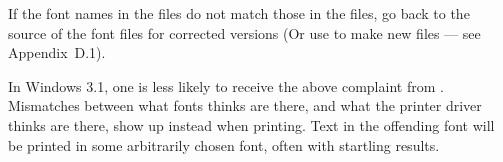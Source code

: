  If the font names in the {\PFM} files do not match
those in the {\PFB} files, go back to the source of the font files
for corrected versions (Or use {\AFMTOPFM} to make new {\PFM} files
--- see Appendix~D.1).

\noindent
In Windows 3.1, one is less likely to receive the above complaint from
{\ATM}.  Mismatches between what fonts {\ATM} thinks are there, and what
the printer driver thinks are there, show up instead when printing.
Text in the offending font will be printed in some arbitrarily chosen
font, often with startling results.









